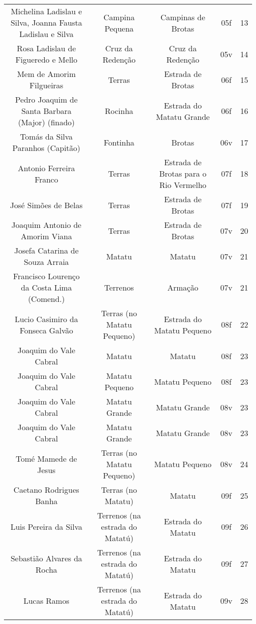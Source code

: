 \begin{table}[!htp]
{\begin{tiny}
\begin{tabular}{ccccc}
Michelina Ladislau e Silva, Joanna Fausta Ladislau e Silva			&Campina Pequena			&Campinas de Brotas			&05f			&13			&\\
Rosa Ladislau de Figueredo e Mello						&Cruz da Redenção			&Cruz da Redenção			&05v			&14			&\\
Mem de Amorim Filgueiras							&Terras					&Estrada de Brotas			&06f			&15			&\\
Pedro Joaquim de Santa Barbara (Major) (finado)					&Rocinha				&Estrada do Matatu Grande		&06f			&16			&\\
Tomás da Silva Paranhos (Capitão)						&Fontinha				&Brotas					&06v			&17			&\\
Antonio Ferreira Franco								&Terras					&Estrada de Brotas para o Rio Vermelho	&07f			&18			&\\
José Simões de Belas								&Terras					&Estrada de Brotas			&07f			&19			&\\
Joaquim Antonio de Amorim Viana							&Terras					&Estrada de Brotas			&07v			&20			&\\
Josefa Catarina de Souza Arraia							&Matatu					&Matatu					&07v			&21			&\\
Francisco Lourenço da Costa Lima (Comend.)					&Terrenos				&Armação				&07v			&21			&\\
Lucio Casimiro da Fonseca Galvão						&Terras (no Matatu Pequeno)		&Estrada do Matatu Pequeno		&08f			&22			&\\
Joaquim do Vale Cabral								&Matatu					&Matatu					&08f			&23			&\\
Joaquim do Vale Cabral								&Matatu Pequeno				&Matatu Pequeno				&08f			&23			&\\
Joaquim do Vale Cabral								&Matatu Grande				&Matatu Grande				&08v			&23			&\\
Joaquim do Vale Cabral								&Matatu Grande				&Matatu Grande				&08v			&23			&\\
Tomé Mamede de Jesus								&Terras (no Matatu Pequeno)		&Matatu Pequeno				&08v			&24			&\\
Caetano Rodrigues Banha								&Terras (no Matatu)			&Matatu					&09f			&25			&\\
Luis Pereira da Silva								&Terrenos (na estrada do Matatú)	&Estrada do Matatu			&09f			&26			&\\
Sebastião Alvares da Rocha							&Terrenos (na estrada do Matatú)	&Estrada do Matatu			&09f			&27			&\\
Lucas Ramos									&Terrenos (na estrada do Matatú)	&Estrada do Matatu			&09v			&28			&\\

\end{tabular}
\end{tiny}}
\end{table}
